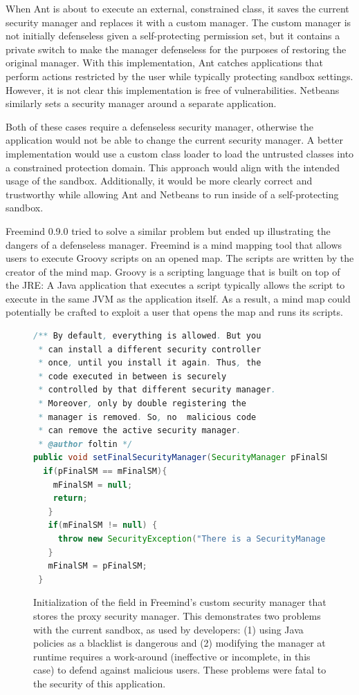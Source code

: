 \documentclass{sig-alternate}
\begin{document}
When Ant is about to execute an external, constrained class, it saves the current security manager and replaces it with a custom manager. The custom manager is not initially defenseless given a self-protecting permission set, but it contains a private switch to make the manager defenseless for the purposes of restoring the original manager. With this implementation, Ant catches applications that perform actions
restricted by the user while typically protecting sandbox settings. However, it is not clear this implementation
is free of vulnerabilities. Netbeans similarly sets a security manager around a separate application.

Both of these cases require a defenseless security manager, otherwise
the application would not be able to change the current security manager.
A better implementation would use a custom class
loader to load the untrusted classes into a constrained protection
domain. This approach would align with the intended usage of the sandbox.
Additionally, it would be more clearly correct and trustworthy while
allowing Ant and Netbeans to run inside of a self-protecting sandbox.

Freemind 0.9.0 tried to solve a similar problem but ended up illustrating
the dangers of a defenseless manager. Freemind is a mind mapping tool
that allows users to execute Groovy scripts on an opened map. The
scripts are written by the creator of the mind map. Groovy is a scripting
language that is built on top of the JRE: A Java application that
executes a script typically allows the script to execute in the same
JVM as the application itself. As a result, a mind map could potentially
be crafted to exploit a user that opens the map and runs its scripts.

\begin{figure}
\begin{lstlisting}[language=Java,firstnumber=31]
/** By default, everything is allowed. But you
 * can install a different security controller
 * once, until you install it again. Thus, the
 * code executed in between is securely
 * controlled by that different security manager.  
 * Moreover, only by double registering the
 * manager is removed. So, no  malicious code 
 * can remove the active security manager.  
 * @author foltin */
public void setFinalSecurityManager(SecurityManager pFinalSM) {
  if(pFinalSM == mFinalSM){
    mFinalSM = null;
    return;
   } 		
   if(mFinalSM != null) {
     throw new SecurityException("There is a SecurityManager installed already."); 		
   } 		
   mFinalSM = pFinalSM;
 }	
\end{lstlisting}
\caption{Initialization of the field in Freemind's custom security
  manager\label{fig:Freemind-Security-Manager} that stores the proxy security
  manager. This demonstrates two problems with the current sandbox, as used by developers: (1) 
  using Java policies as a blacklist is
  dangerous and (2) modifying the manager at runtime requires 
  a work-around (ineffective or incomplete, in this case) to defend against malicious
  users. These problems were fatal to the security of this application.}
\end{figure}
\end{document}
